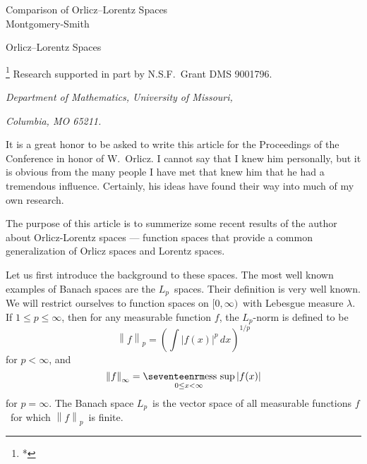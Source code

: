\def\lnorm{\left\|}
\def\rnorm{\right\|}
\def\normo#1{\lnorm #1 \rnorm}
\def\widedot{\,\cdot\,}
\def\normdot{\normo{\widedot}}
\def\trinormo#1{\left|\left|\left| #1 \right|\right|\right|}
\def\trinormdot{\trinormo{\widedot}}

\def\lmod{\left|}
\def\rmod{\right|}
\def\modo#1{\lmod #1 \rmod}

\def\angleo#1{\left\langle #1 \right\rangle}

\def\dom#1{{\vert_{#1}}}

\def\implies{$\Rightarrow$}
\def\iff{$\Leftrightarrow$}


\def\Deltacond{$\Delta_2$-condition}
\def\phifunction{$\varphi$-function}
\def\Nfunction{{\it N}-function}
\def\conditionJ{condition~$(J)$}
\def\conditionL{condition~$(L)$}
\def\em{\mathop{\rm em}\nolimits}
\def\lm{\mathop{\rm lm}\nolimits}
\def\T{{\cal T}}


\noblankout

\setheadline Comparison of Orlicz--Lorentz Spaces\\
             Montgomery-Smith

{
\seventeenpoint
\centerline{\bigseventeenrm Orlicz--Lorentz Spaces}
}
\bigskip\bigskip\medskip
\centerline{%
\footnote{*}%
{Research supported in part by N.S.F.\ Grant DMS 9001796.}%
}
\smallskip
{
\eightpoint
\centerline{\it Department of Mathematics, University of Missouri,}
\centerline{\it Columbia, MO 65211.}
}
\bigskip\bigskip


It is a great honor to be asked to write this article for the
Proceedings of the Conference in honor of W.~Orlicz. I cannot say that I knew
him personally, but it is obvious from the many people I have met that knew him
that he had a tremendous influence. Certainly, his ideas have found their way
into much of my own research.

The purpose of this article is to summerize some recent results of the author
about Orlicz-Lorentz spaces --- function spaces that provide a common
generalization of Orlicz spaces and Lorentz spaces.

Let us first introduce the background to these spaces.
The most well known examples of Banach spaces are the $L_p$\ spaces. Their
definition is very well known. We will restrict ourselves to function spaces on
$[0,\infty)$\ with Lebesgue measure $\lambda$. If $1\le p \le
\infty$, then for any measurable function $f$, the $L_p$-norm is
defined to be 
$$ \normo f_p = 
   \left( \int \modo{f(x)}^p \,dx \right)^{1/p} $$
for $p<\infty$, and
$$ \normo f_\infty = \mathop{\hbox{\rm ess sup}}\limits_{0\le x<\infty}
   \modo{f(x)} $$
for $p=\infty$.
The Banach space $L_p$\ is the vector space of
all measurable functions $f$\ for which $\normo f_p$\ is finite.

